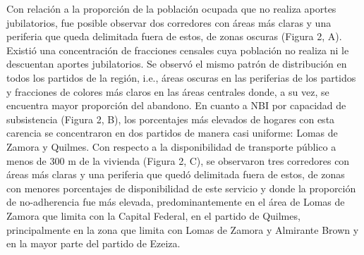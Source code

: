 \begin{multicols}{2}
\par{}Con relación a la proporción de la población ocupada que no realiza aportes jubilatorios,\allowbreak{} fue posible observar dos corredores con áreas más claras y una periferia que queda delimitada fuera de estos,\allowbreak{} de zonas oscuras (\allowbreak{}Figura 2,\allowbreak{} A)\allowbreak{}.\allowbreak{} Existió una concentración de fracciones censales cuya población no realiza ni le descuentan aportes jubilatorios.\allowbreak{} Se observó el mismo patrón de distribución en todos los partidos de la región,\allowbreak{} i.\allowbreak{}e.\allowbreak{},\allowbreak{} áreas oscuras en las periferias de los partidos y fracciones de colores más claros en las áreas centrales donde,\allowbreak{} a su vez,\allowbreak{} se encuentra mayor proporción del abandono.\allowbreak{} En cuanto a NBI por capacidad de subsistencia (\allowbreak{}Figura 2,\allowbreak{} B)\allowbreak{},\allowbreak{} los porcentajes más elevados de hogares con esta carencia se concentraron en dos partidos de manera casi uniforme:\allowbreak{} Lomas de Zamora y Quilmes.\allowbreak{} Con respecto a la disponibilidad de transporte público a menos de 300 m de la vivienda (\allowbreak{}Figura 2,\allowbreak{} C)\allowbreak{},\allowbreak{} se observaron tres corredores con áreas más claras y una periferia que quedó delimitada fuera de estos,\allowbreak{} de zonas con menores porcentajes de disponibilidad de este servicio y donde la proporción de no-\allowbreak{}adherencia fue más elevada,\allowbreak{} predominantemente en el área de Lomas de Zamora que limita con la Capital Federal,\allowbreak{} en el partido de Quilmes,\allowbreak{} principalmente en la zona que limita con Lomas de Zamora y Almirante Brown y en la mayor parte del partido de Ezeiza.\allowbreak{}\par{}
\par
{
}
\end{multicols}
